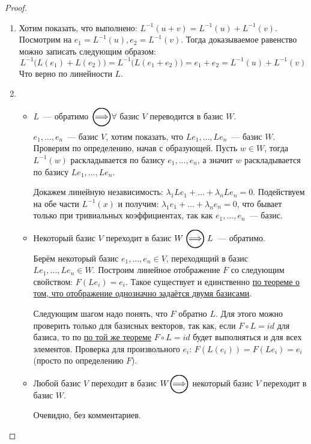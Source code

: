 \begin{proof}\leavevmode
    \begin{enumerate}
        \item 
            Хотим показать, что выполнено: $L^{-1}(u + v) = L^{-1}(u) + L^{-1}(v)$. Посмотрим на 
            $e_1 = L^{-1}(u), e_2 = L^{-1}(v)$. Тогда доказываемое равенство можно записать следующим
            образом: 
            $$L^{-1}\big(L(e_1) + L(e_2)\big) = L^{-1}\big(L(e_1 + e_2)\big) = e_1 + e_2 =
            L^{-1}(u) + L^{-1}(v)$$
            Что верно по линейности $L$.
        \item
            \begin{itemize}
                \item
                    $L$~--- обратимо $\ora \forall$ базис $V$ переводится в базис $W$.

                    $e_1,\dots,e_n$~--- базис $V$, хотим показать, что $Le_1,\dots,Le_n$~--- базис $W$.
                    Проверим по определению, начав с образующей. Пусть $w\in W$, тогда
                    $L^{-1}(w)$ раскладывается по базису $e_1,\dots, e_n$, а значит $w$
                    раскладывается по базису $Le_1,\dots, Le_n$. 

                    Докажем линейную независимость: $\lambda_1Le_1 + \dots + \lambda_nLe_n=0$.
                    Подействуем на обе части $L^{-1}(x)$ и получим: $\lambda_1e_1+\dots+\lambda_ne_n=0$, 
                    что бывает только при тривиальных коэффициентах, так как $e_1,\dots,e_n$~--- базис.
                \item
                    Некоторый базис $V$ переходит в базис $W\ora L$~--- обратимо.

                    Берём некоторый базис $e_1,\dots,e_n \in V$, переходящий в базис 
                    $Le_1,\dots,Le_n \in W$. Построим линейное отображение $F$ со следующим свойством:
                    $F(Le_i)=e_i$. Такое существует и единственно \hyperref[thm:Линейное отображение однозначно задаётся двумя базисами]
                    {по теореме о том, что отображение однозначно задаётся двумя базисами}.

                    Следующим шагом надо понять, что $F$ обратно $L$. Для этого можно проверить
                    только для базисных векторов, так как, если $F\circ L = id$ для базиса, то по \hyperref[thm:Линейное отображение однозначно задаётся двумя базисами]
                    {по той же теореме} $F\circ L = id$ будет выполняться и для всех элементов.
                    Проверка для произвольного $e_i$: $F(L(e_i)) = F(Le_i) = e_i$(просто по определению $F$).
                \item
                    Любой базис $V$ переходит в базис $W\ora $ некоторый базис $V$ переходит в базис $W$.

                    Очевидно, без комментариев.
            \end{itemize}
    \end{enumerate}
\end{proof}
